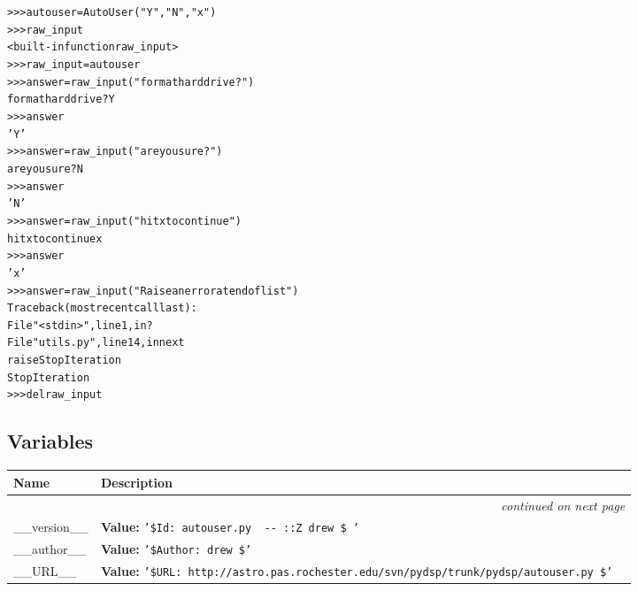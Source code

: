 \begin{alltt}
{\textgreater}{\textgreater}{\textgreater} autouser = AutoUser("Y","N","x")
{\textgreater}{\textgreater}{\textgreater} raw\_input
{\textless}built-in function raw\_input{\textgreater}
{\textgreater}{\textgreater}{\textgreater} raw\_input = autouser
{\textgreater}{\textgreater}{\textgreater} answer = raw\_input("format hard drive?")
format hard drive? Y
{\textgreater}{\textgreater}{\textgreater} answer
'Y'
{\textgreater}{\textgreater}{\textgreater} answer = raw\_input("are you sure?")
are you sure? N
{\textgreater}{\textgreater}{\textgreater} answer
'N'
{\textgreater}{\textgreater}{\textgreater} answer = raw\_input("hit x to continue")
hit x to continue x
{\textgreater}{\textgreater}{\textgreater} answer
'x'
{\textgreater}{\textgreater}{\textgreater} answer = raw\_input("Raise an error at end of list")
Traceback (most recent call last):
  File "{\textless}stdin{\textgreater}", line 1, in ?
  File "utils.py", line 14, in next
    raise StopIteration
StopIteration
{\textgreater}{\textgreater}{\textgreater} del raw\_input\end{alltt}



  \subsection{Variables}

\begin{longtable}{|p{}|p{}|l}
\cline{1-2}
\cline{1-2} \centering \textbf{Name} & \centering \textbf{Description}& \\
\cline{1-2}
\endhead\cline{1-2}\multicolumn{3}{r}{\small\textit{continued on next page}}\\\endfoot\cline{1-2}
\endlastfoot\raggedright \_\-\_\-v\-e\-r\-s\-i\-o\-n\-\_\-\_\- & \textbf{Value:} 
{\tt '\-\$\-I\-d\-:\-~\-a\-u\-t\-o\-u\-s\-e\-r\-.\-p\-y\-~\-4\-0\-1\-~\-2\-0\-0\-6\--\-0\-7\--\-1\-1\-~\-2\-2\-:\-3\-1\-:\-5\-8\-Z\-~\-d\-r\-e\-w\-~\-\$\-~\-'\-}&\\
\cline{1-2}
\raggedright \_\-\_\-a\-u\-t\-h\-o\-r\-\_\-\_\- & \textbf{Value:} 
{\tt '\-\$\-A\-u\-t\-h\-o\-r\-:\-~\-d\-r\-e\-w\-~\-\$\-'\-}&\\
\cline{1-2}
\raggedright \_\-\_\-U\-R\-L\-\_\-\_\- & \textbf{Value:} 
{\tt '\-\$\-U\-R\-L\-:\-~\-h\-t\-t\-p\-:\-/\-/\-a\-s\-t\-r\-o\-.\-p\-a\-s\-.\-r\-o\-c\-h\-e\-s\-t\-e\-r\-.\-e\-d\-u\-/\-s\-v\-n\-/\-p\-y\-d\-s\-p\-/\-t\-r\-u\-n\-k\-/\-p\-y\-d\-s\-p\-/\-a\-u\-t\-o\-u\-s\-e\-r\-.\-p\-y\-~\-\$\-'\-}&\\
\cline{1-2}
\end{longtable}


